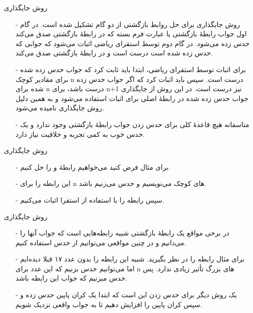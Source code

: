 
\begin{frame}{‌روش جایگذاری}
\begin{itemize}\itemr
\item[-]
روش جایگذاری برای حل روابط بازگشتی از دو گام تشکیل شده است. در گام اول جواب رابطهٔ بازگشتی یا عبارت فرم بسته
که در رابطهٔ بازگشتی صدق می‌کند حدس زده می‌شود. در گام دوم توسط استقرای ریاضی
اثبات می‌شود که جوابی که حدس زده شده است درست است و در رابطهٔ بازگشتی صدق می‌کند.
\item[-]
برای اثبات توسط استقرای ریاضی، ابتدا باید ثابت کرد که جواب حدس زده شده برای مقادیر کوچک n درست است. سپس باید اثبات کرد که اگر جواب حدس زده شده برای n درست باشد، برای
n+1
نیز درست است. در این روش از جایگذاری جواب حدس زده شده در رابطهٔ اصلی برای اثبات استفاده می‌شود و به همین دلیل روش جایگذاری نامیده می‌شود.
\item[-]
متاسفانه هیچ قاعدهٔ کلی برای حدس زدن جواب رابطهٔ بازگشتی وجود ندارد و یک حدس خوب به کمی تجربه و خلاقیت نیاز دارد.
\end{itemize}
\end{frame}



\begin{frame}{‌روش جایگذاری}
\begin{itemize}\itemr
\item[-]
برای مثال فرض کنید می‌خواهیم رابطهٔ
و
را حل کنیم.
\item[-]
این رابطه را برای n های کوچک می‌نویسیم و حدس می‌زنیم 
باشد.
\item[-]
سپس رابطه را با استفاده از استقرا اثبات می‌کنیم.
\end{itemize}
\end{frame}


\begin{frame}{‌روش جایگذاری}
\begin{itemize}\itemr
\item[-]
در برخی مواقع یک رابطهٔ بازگشتی شبیه رابطه‌هایی است که جواب آنها را می‌دانیم و در چنین مواقعی می‌توانیم از حدس استفاده کنیم.
\item[-]
برای مثال رابطه
را در نظر بگیرید. شبیه این رابطه را بدون عدد ۱۷ قبلا دیده‌ایم اما می‌توانیم حدس بزنیم که این عدد برای n های بزرگ تأثیر زیادی ندارد. پس حدس میزنیم که جواب این رابطه
باشد.
\item[-]
یک روش دیگر برای حدس زدن این است که ابتدا یک کران پایین حدس زده و سپس کران پایین را افزایش دهیم تا به جواب واقعی نزدیک شویم.
\end{itemize}
\end{frame}